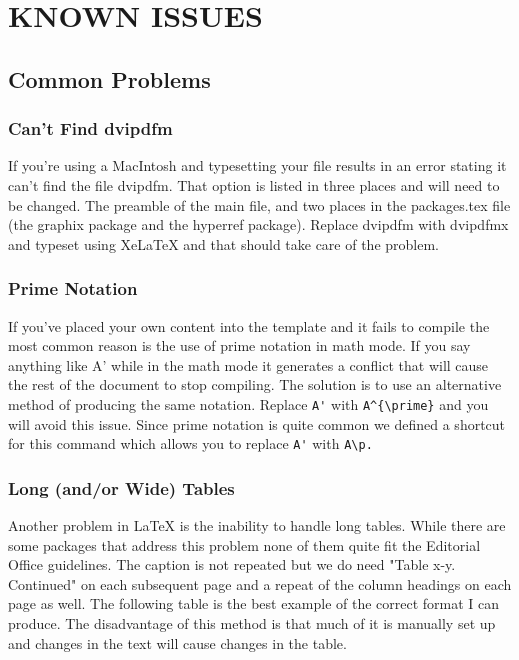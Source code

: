 \chapter{KNOWN ISSUES}
\section{Common Problems}
\subsection{Can't Find dvipdfm}

If you're using a MacIntosh and typesetting your file results in an error stating it can't find the file dvipdfm. That option is listed in three places and will need to be changed. The preamble of the main file, and two places in the packages.tex file (the graphix package and the hyperref package). Replace dvipdfm with dvipdfmx and typeset using XeLaTeX and that should take care of the problem.

\subsection{Prime Notation}

If you've placed your own content into the template and it fails to compile the most common reason is the use of prime notation in math mode. If you say anything like A' while in the math mode it generates a conflict that will cause the rest of the document to stop compiling. The solution is to use an alternative method of producing the same notation. Replace \verb=A'=  with \verb=A^{\prime}= and you will avoid this issue. Since prime notation is quite common we defined a shortcut for this command which allows you to replace \verb=A'= with \verb=A\p.= \citep{Brady01}

\subsection{Long (and/or Wide) Tables}

Another problem in LaTeX is the inability to handle long tables. While there are some packages that address this problem none of them quite fit the Editorial Office guidelines. The caption is not repeated but we do need "Table x-y. Continued" on each subsequent page and a repeat of the column headings on each page as well. The following table is the best example of the correct format I can produce. The disadvantage of this method is that much of it is manually set up and changes in the text will cause changes in the table. \citep{Sato91}

